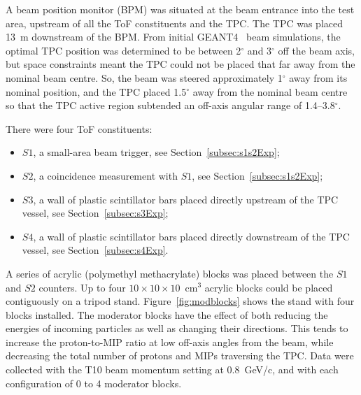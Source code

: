 A beam position monitor (BPM) was situated at the beam entrance into the test area, upstream of all the ToF constituents and the TPC. 
The TPC was placed 13~m downstream of the BPM. 
From initial GEANT4~\cite{brun1993geant} beam simulations, the optimal TPC position was determined to be between 2$^{ \circ }$ and 3$^{ \circ }$ off the beam axis, but space constraints meant the TPC could not be placed that far away from the nominal beam centre. So, the beam was steered approximately 1$^{ \circ }$ away from its nominal position, and the TPC placed 1.5$^{ \circ }$ away from the nominal beam centre so that the TPC active region subtended an off-axis angular range of 1.4--3.8$^{ \circ }$.

There were four ToF constituents: 
\begin{itemize}
    \item $\mathit{S1}$, a small-area beam trigger, see Section~\ref{subsec:s1s2Exp};
    \item $\mathit{S2}$, a coincidence measurement with $\mathit{S1}$, see Section~\ref{subsec:s1s2Exp};
    \item $\mathit{S3}$, a wall of plastic scintillator bars placed directly upstream of the TPC vessel, see Section~\ref{subsec:s3Exp};
    \item $\mathit{S4}$, a wall of plastic scintillator bars placed directly downstream of the TPC vessel, see Section~\ref{subsec:s4Exp}.
\end{itemize}

A series of acrylic (polymethyl methacrylate) blocks was placed between the $\mathit{S1}$ and $\mathit{S2}$ counters.
Up to four $10\times10\times10$~cm$^3$ acrylic blocks could be placed contiguously on a tripod stand.
Figure~\ref{fig:modblocks} shows the stand with four blocks installed.
The moderator blocks have the effect of both reducing the energies of incoming particles as well as changing their directions.
This tends to increase the proton-to-MIP ratio at low off-axis angles from the beam, while decreasing the total number of protons and MIPs traversing the TPC.
Data were collected with the T10 beam momentum setting at 0.8~GeV/c, and with each configuration of 0 to 4 moderator blocks.

